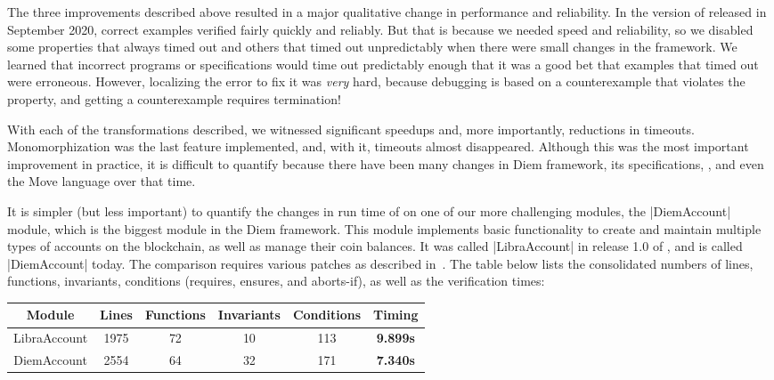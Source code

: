 

The three improvements described above resulted in a major qualitative
change in performance and reliability. In the version of \MVP released
in September 2020, correct examples verified fairly quickly and
reliably.  But that is because we needed speed and reliability, so we
disabled some properties that always timed out and others that timed
out unpredictably when there were small changes in the framework.  We
learned that incorrect programs or specifications would time out
predictably enough that it was a good bet that examples that timed out
were erroneous.  However, localizing the error to fix it was
\emph{very} hard, because debugging is based on a counterexample that
violates the property, and getting a counterexample requires
termination!

With each of the transformations described, we witnessed significant speedups
and, more importantly, reductions in timeouts.  Monomorphization was the last
feature implemented, and, with it, timeouts almost disappeared. Although this
was the most important improvement in practice, it is difficult to quantify
because there have been many changes in Diem framework, its specifications,
\MVP, and even the Move language over that time.

It is simpler (but less important) to quantify the changes in run time of \MVP
on one of our more challenging modules, the |DiemAccount| module, which is the
biggest module in the Diem framework. This module implements basic functionality
to create and maintain multiple types of accounts on the blockchain, as well as
manage their coin balances. It was called |LibraAccount| in release 1.0 of \MVP,
and is called |DiemAccount| today. The comparison requires various patches as
described in~\cite{MVP_ARTIFACT}. The table below lists the consolidated numbers
of lines, functions, invariants, conditions (requires, ensures, and aborts-if),
as well as the verification times:

{
\setlength{\tabcolsep}{6pt}
\vspace{2ex}
\begin{tabular*}{0.9\textwidth}{cccccc}
  \hline
  \hline
  Module & Lines & Functions & Invariants & Conditions & Timing \\
  \hline
  LibraAccount & 1975 & 72 & 10 & 113 & \textbf{9.899s} \\
  DiemAccount & 2554 & 64 & 32 & 171 & \textbf{7.340s} \\
  \hline
\end{tabular*}
\vspace{2ex}
}

